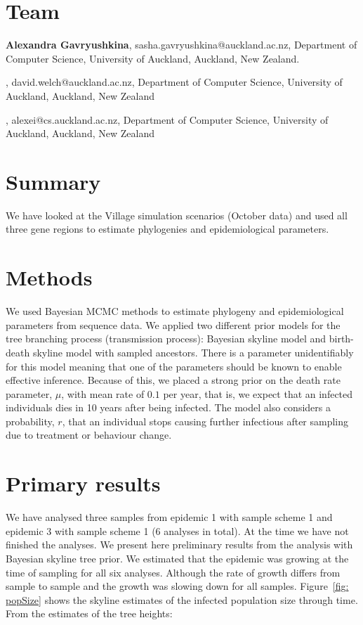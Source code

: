 \documentclass[12pt]{article}
\begin{document}
\section{Team}

{\bf Alexandra Gavryushkina}, sasha.gavryushkina@auckland.ac.nz, Department of Computer Science, University of Auckland, Auckland, New Zealand. 

\vskip2mm

, david.welch@auckland.ac.nz, Department of Computer Science, University of Auckland, Auckland, New Zealand

\vskip2mm

, alexei@cs.auckland.ac.nz, Department of Computer Science, University of Auckland, Auckland, New Zealand


\section{Summary}

We have looked at the Village simulation scenarios (October data) and used all three gene regions to estimate phylogenies and epidemiological parameters.

\section{Methods}

We used Bayesian MCMC methods to estimate phylogeny and epidemiological parameters from sequence data. We applied two different prior models for the tree branching process (transmission process): Bayesian skyline model and birth-death skyline model with sampled ancestors. There is a parameter unidentifiably for this model meaning that one of the parameters should be known to enable effective inference. Because of this, we placed a strong prior on the death rate parameter, $\mu$, with mean rate of $0.1$ per year, that is, we expect that an infected individuals dies in 10 years after being infected. The model also considers a probability, $r$, that an individual stops causing further infectious after sampling due to treatment or behaviour change. 

\section{Primary results}

We have analysed three samples from epidemic 1 with sample scheme 1 and epidemic 3 with sample scheme 1 (6 analyses in total). At the time we have not finished the analyses. We present here preliminary results from the analysis with Bayesian skyline tree prior. We estimated that the epidemic was growing at the time of sampling for all six analyses. Although the rate of growth differs from sample to sample and the growth was slowing down for all samples. Figure~\ref{fig: popSize} shows the skyline estimates of the infected population size through time.  From the estimates of the tree heights:
\end{document}
